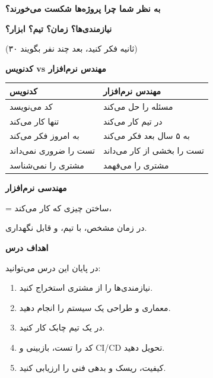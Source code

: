 \documentclass[14pt, a4paper, landscape]{extarticle}
\newcommand{\slide}[1]{%
    \newpage
    \begin{center}
    \begin{minipage}[t]{0.95\textwidth}
    \vspace{0.5cm}
    #1
    \vspace{0.5cm}
    \end{minipage}
    \end{center}
}
\newcommand{\slidetitle}[1]{%
    \begin{center}
        {\LARGE\bfseries\textcolor{primary}{#1}}
    \end{center}
    \vspace{0.5cm}
}
\newcommand{\myaccent}[1]{\textcolor{accent}{#1}}
\begin{document}
\slide{
    \slidetitle{به نظر شما چرا پروژه‌ها شکست می‌خورند؟}
    \vspace{1cm}
    \begin{center}
        {\Huge\bfseries\textcolor{primary}{نیازمندی‌ها؟ زمان؟ تیم؟ ابزار؟}}
        
        \vspace{1.5cm}
        
        {\large\myaccent{(۳۰ ثانیه فکر کنید، بعد چند نفر بگویند)}}
    \end{center}
}

\slide{
    \slidetitle{کدنویس vs مهندس نرم‌افزار}
    \vspace{0.5cm}
    \begin{center}
        \begin{tabular}{p{6cm}p{6cm}}
            \toprule
            \textbf{\large کدنویس} & \textbf{\large مهندس نرم‌افزار} \\
            \midrule
            کد می‌نویسد & مسئله را حل می‌کند \\
            \hline
            تنها کار می‌کند & در تیم کار می‌کند \\
            \hline
            به امروز فکر می‌کند & به ۵ سال بعد فکر می‌کند \\
            \hline
            تست را ضروری نمی‌داند & تست را بخشی از کار می‌داند \\
            \hline
            مشتری را نمی‌شناسد & مشتری را می‌فهمد \\
            \bottomrule
        \end{tabular}
    \end{center}
}

\slide{
    \begin{center}
        \vspace{2.5cm}
        {\Huge\bfseries مهندسی نرم‌افزار}
        
        \vspace{1.5cm}
        
        {\LARGE\myaccent{= ساختن چیزی که کار می‌کند،}}
        
        \vspace{0.5cm}
        
        {\LARGE\myaccent{در زمان مشخص، با تیم، و قابل نگهداری.}}
    \end{center}
}

\slide{
    \slidetitle{اهداف درس}
    \vspace{0.5cm}
    {\large در پایان این درس می‌توانید:}
    \vspace{0.5cm}
    \begin{enumerate}[itemsep=0.6em]
        \item نیازمندی‌ها را از مشتری استخراج کنید.
        \item معماری و طراحی یک سیستم را انجام دهید.
        \item در یک تیم چابک کار کنید.
        \item کد را تست، بازبینی و CI/CD تحویل دهید.
        \item کیفیت، ریسک و بدهی فنی را ارزیابی کنید.
    \end{enumerate}
}
\end{document}
